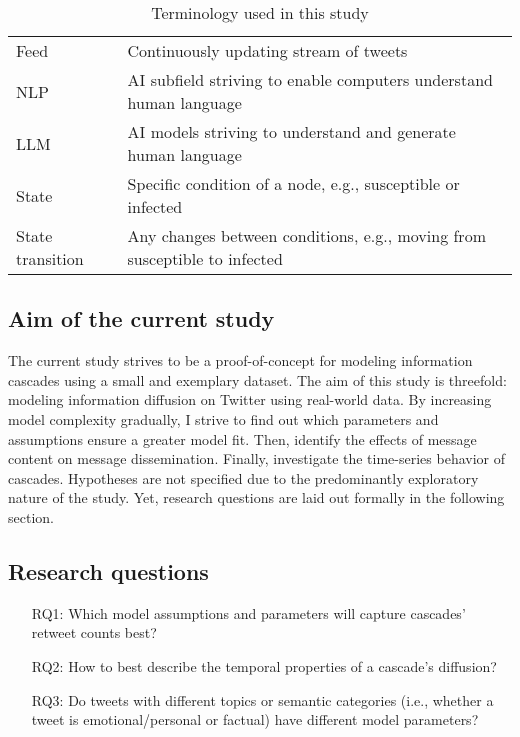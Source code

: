 \documentclass[11pt,a4paper]{article}
\begin{document}
\begin{table}[h]
\begin{tabularx}{\textwidth}{|l|X|}
        Feed & Continuously updating stream of tweets \\
        NLP & AI subfield striving to enable computers understand human language \\
        LLM & AI models striving to understand and generate human language \\
        State & Specific condition of a node, e.g., susceptible or infected \\
        State transition & Any changes between conditions, e.g., moving from susceptible to infected \\
        \hline 
    \end{tabularx}
    \caption{Terminology used in this study}
\end{table}
    
    \subsection{Aim of the current study}
    The current study strives to be a proof-of-concept for modeling information cascades using a small and exemplary dataset. The aim of this study is threefold: modeling information diffusion on Twitter using real-world data. By increasing model complexity gradually, I strive to find out which parameters and assumptions ensure a greater model fit. Then, identify the effects of message content on message dissemination. Finally, investigate the time-series behavior of cascades. Hypotheses are not specified due to the predominantly exploratory nature of the study. Yet, research questions are laid out formally in the following section.
    \subsection{Research questions}
        \begin{enumerate}
                \item[RQ1:] Which model assumptions and parameters will capture cascades' retweet counts best?
                
                \item[RQ2:] How to best describe the temporal properties of a cascade's diffusion?
                
                \item[RQ3:] Do tweets with different topics or semantic categories (i.e., whether a tweet is emotional/personal or factual) have different model parameters?
        \end{enumerate}
\end{document}
